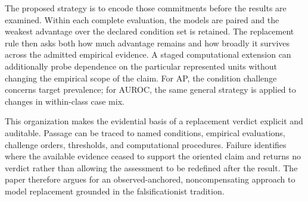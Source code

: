 \documentclass[11pt]{article}
\theoremstyle{remark}
\begin{document}
The proposed strategy is to encode those commitments before the results are
examined. Within each complete evaluation, the models are paired and the
weakest advantage over the declared condition set is retained. The replacement
rule then asks both how much advantage remains and how broadly it survives
across the admitted empirical evidence. A staged computational extension can
additionally probe dependence on the particular represented units without
changing the empirical scope of the claim. For AP, the condition challenge
concerns target prevalence; for AUROC, the same general strategy is applied to
changes in within-class case mix.

This organization makes the evidential basis of a replacement verdict explicit
and auditable. Passage can be traced to named conditions, empirical
evaluations, challenge orders, thresholds, and computational procedures.
Failure identifies where the available evidence ceased to support the oriented
claim and returns no verdict rather than allowing the assessment to be
redefined after the result. The paper therefore argues for an observed-anchored,
noncompensating approach to model replacement grounded in the falsificationist
tradition.
\end{document}
